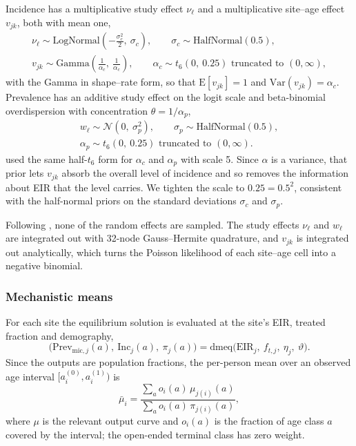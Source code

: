 Incidence has a multiplicative study effect $\nu_\ell$ and a multiplicative site--age effect $v_{jk}$, both with mean one,
\begin{gather*}
\nu_\ell \sim \mathrm{LogNormal}\!\left(-\frac{\sigma_c^2}{2},\ \sigma_c\right),
\qquad
\sigma_c \sim \mathrm{HalfNormal}(0.5), \\
v_{jk} \sim \mathrm{Gamma}\!\left(\frac{1}{\alpha_c},\ \frac{1}{\alpha_c}\right),
\qquad
\alpha_c \sim t_6(0,\ 0.25) \text{ truncated to } (0, \infty),
\end{gather*}
with the Gamma in shape--rate form, so that $\mathrm{E}[v_{jk}] = 1$ and $\mathrm{Var}(v_{jk}) = \alpha_c$. Prevalence has an additive study effect on the logit scale and beta-binomial overdispersion with concentration $\theta = 1/\alpha_p$,
\begin{gather*}
w_\ell \sim \mathcal{N}(0,\ \sigma_p^2),
\qquad
\sigma_p \sim \mathrm{HalfNormal}(0.5), \\
\alpha_p \sim t_6(0,\ 0.25) \text{ truncated to } (0, \infty).
\end{gather*}
\citet{griffin_estimates_2014} used the same half-$t_6$ form for $\alpha_c$ and $\alpha_p$ with scale 5. Since $\alpha$ is a variance, that prior lets $v_{jk}$ absorb the overall level of incidence and so removes the information about EIR that the level carries. We tighten the scale to $0.25 = 0.5^2$, consistent with the half-normal priors on the standard deviations $\sigma_c$ and $\sigma_p$.

Following \citet{griffin_estimates_2014}, none of the random effects are sampled. The study effects $\nu_\ell$ and $w_\ell$ are integrated out with 32-node Gauss--Hermite quadrature, and $v_{jk}$ is integrated out analytically, which turns the Poisson likelihood of each site--age cell into a negative binomial.

\subsubsection{Mechanistic means}

For each site the equilibrium solution is evaluated at the site's EIR, treated fraction and demography,
\begin{equation*}
\big(\mathrm{Prev}_{\mathrm{mic},j}(a),\ \mathrm{Inc}_j(a),\ \pi_j(a)\big) = \mathrm{dmeq}\big(\mathrm{EIR}_j,\ f_{t,j},\ \eta_j,\ \vartheta\big).
\end{equation*}
Since the outputs are population fractions, the per-person mean over an observed age interval $[a^{(0)}_i, a^{(1)}_i)$ is
\begin{equation*}
\bar\mu_i = \frac{\sum_a o_i(a)\,\mu_{j(i)}(a)}{\sum_a o_i(a)\,\pi_{j(i)}(a)},
\end{equation*}
where $\mu$ is the relevant output curve and $o_i(a)$ is the fraction of age class $a$ covered by the interval; the open-ended terminal class has zero weight.

